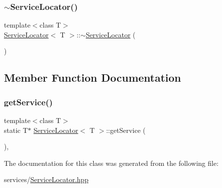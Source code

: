 \subsubsection{\texorpdfstring{$\sim$\+Service\+Locator()}{~ServiceLocator()}}
{\footnotesize\ttfamily template$<$class T$>$ \\
\mbox{\hyperlink{classServiceLocator}{Service\+Locator}}$<$ T $>$\+::$\sim$\mbox{\hyperlink{classServiceLocator}{Service\+Locator}} (\begin{DoxyParamCaption}{ }\end{DoxyParamCaption})\hspace{0.3cm}{\ttfamily [inline]}}



\subsection{Member Function Documentation}
\mbox{\label{classServiceLocator_a41f5c5b0ec8ca27e1b463c5383854cbd}} 
\subsubsection{\texorpdfstring{get\+Service()}{getService()}}
{\footnotesize\ttfamily template$<$class T$>$ \\
static T$\ast$ \mbox{\hyperlink{classServiceLocator}{Service\+Locator}}$<$ T $>$\+::get\+Service (\begin{DoxyParamCaption}{ }\end{DoxyParamCaption})\hspace{0.3cm}{\ttfamily [inline]}, {\ttfamily [static]}}



The documentation for this class was generated from the following file\+:\begin{DoxyCompactItemize}
\item 
services/\mbox{\hyperlink{ServiceLocator_8hpp}{Service\+Locator.\+hpp}}\end{DoxyCompactItemize}
